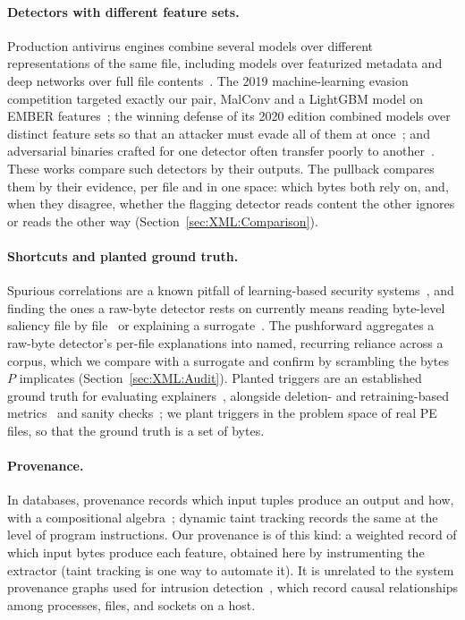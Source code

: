 \paragraph{Detectors with different feature sets.} Production antivirus engines combine several models over different representations of the same file, including models over featurized metadata and deep networks over full file contents~\cite{microsoft2019insideout}. The 2019 machine-learning evasion competition targeted exactly our pair, MalConv and a LightGBM model on EMBER features~\cite{endgame2019mlsec}; the winning defense of its 2020 edition combined models over distinct feature sets so that an attacker must evade all of them at once~\cite{quiring2020against}; and adversarial binaries crafted for one detector often transfer poorly to another~\cite{salman2024robustness}. These works compare such detectors by their outputs. The pullback compares them by their evidence, per file and in one space: which bytes both rely on, and, when they disagree, whether the flagging detector reads content the other ignores or reads the other way (Section~\ref{sec:XML:Comparison}).

\paragraph{Shortcuts and planted ground truth.} Spurious correlations are a known pitfall of learning-based security systems~\cite{arp2022and}, and finding the ones a raw-byte detector rests on currently means reading byte-level saliency file by file~\cite{demetrio2019explaining, bose2020explaining} or explaining a surrogate~\cite{mohammed2026beyond}. The pushforward aggregates a raw-byte detector's per-file explanations into named, recurring reliance across a corpus, which we compare with a surrogate and confirm by scrambling the bytes $P$ implicates (Section~\ref{sec:XML:Audit}). Planted triggers are an established ground truth for evaluating explainers~\cite{lin2021what}, alongside deletion- and retraining-based metrics~\cite{petsiuk2018rise, hooker2019benchmark} and sanity checks~\cite{adebayo2018sanity}; we plant triggers in the problem space of real PE files, so that the ground truth is a set of bytes.

\paragraph{Provenance.} In databases, provenance records which input tuples produce an output and how, with a compositional algebra~\cite{green2007provenance}; dynamic taint tracking records the same at the level of program instructions. Our provenance is of this kind: a weighted record of which input bytes produce each feature, obtained here by instrumenting the extractor (taint tracking is one way to automate it). It is unrelated to the system provenance graphs used for intrusion detection~\cite{cheng2024kairos, milajerdi2019poirot}, which record causal relationships among processes, files, and sockets on a host.
